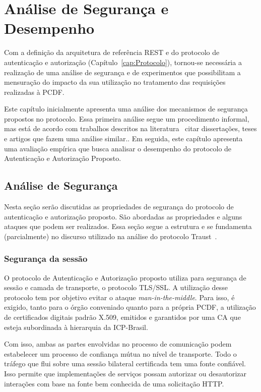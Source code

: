 \chapter{Análise de Segurança e Desempenho}

Com a definição da arquitetura de referência REST e do protocolo de autenticação e autorização (Capítulo~\ref{cap:Protocolo}), tornou-se necessária a realização de uma análise de segurança e de experimentos que possibilitam a mensuração do impacto da sua utilização no tratamento das requisições realizadas à PCDF.

Este capítulo inicialmente apresenta uma análise dos mecanismos de segurança propostos no protocolo. Essa primeira
análise segue um procedimento informal, mas está de acordo com trabalhos descritos na literatura~\cite{} {\color{red}citar
disserta\c c\~{o}es, teses e artigos que fazem uma an\'{a}lise similar.}. Em seguida, este capítulo apresenta uma avaliação empírica que busca analisar o desempenho do protocolo de Autenticação e Autorização Proposto.

\section{Análise de Segurança}

Nesta seção serão discutidas as propriedades de segurança do protocolo de autenticação e autorização proposto. São abordadas as propriedades e alguns ataques que podem ser realizados. Essa seção segue a estrutura e se fundamenta (parcialmente) no discurso utilizado na análise do protocolo Traust~\cite{traust08}.

\subsection{Segurança da sessão}

O protocolo de Autenticação e Autorização proposto utiliza para segurança de sessão e camada de transporte, o protocolo TLS/SSL. A utilização desse protocolo tem por objetivo evitar o ataque \emph{man-in-the-middle}. Para isso, é exigido, tanto para o órgão conveniado quanto para a própria PCDF, a utilização de certificados digitais padrão X.509, emitidos e garantidos por uma CA que esteja subordinada à hierarquia da ICP-Brasil.

Com isso, ambas as partes envolvidas no processo de comunicação podem estabelecer um processo de confiança mútua no nível de transporte. Todo o tráfego que flui sobre uma sessão bilateral certificada tem uma fonte confiável. Isso permite que implementações de serviços possam autorizar ou desautorizar interações com base na fonte bem conhecida de uma solicitação HTTP.

